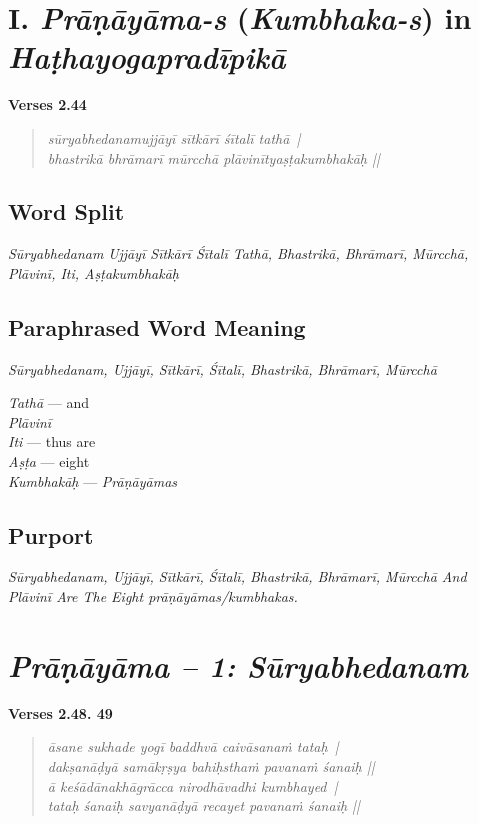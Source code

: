 \section*{I. \textit{Prāṇāyāma-s} (\textit{Kumbhaka-s}) in \textit{Haṭhayogapradīpikā}}

\noindent 
\textbf{Verses 2.44}

\begin{verse}
\textit{sūryabhedanamujjāyī sītkārī śītalī tathā |\\
bhastrikā bhrāmarī mūrcchā plāvinītyaṣṭakumbhakāḥ ||}
\end{verse}

\subsection*{Word Split}

\textit{Sūryabhedanam Ujjāyī Sītkārī Śītalī Tathā, Bhastrikā, Bhrāmarī, Mūrcchā, Plāvinī, Iti, Aṣṭakumbhakāḥ}

\subsection*{Paraphrased Word Meaning}

\textit{Sūryabhedanam, Ujjāyī, Sītkārī, Śītalī, Bhastrikā, Bhrāmarī, Mūrcchā}

\begin{multicols}{2}
\textit{Tathā} --- and \\
\textit{Plāvinī}  \\
\textit{Iti}  --- thus are \\
\textit{Aṣṭa} --- eight \\
\textit{Kumbhakāḥ} --- \textit{Prāṇāyāmas} 
\end{multicols}

\subsection*{Purport}

\textit{Sūryabhedanam, Ujjāyī, Sītkārī, Śītalī, Bhastrikā, Bhrāmarī, Mūrcchā And Plāvinī Are The Eight prāṇāyāmas/kumbhakas.}


\section*{\textit{Prāṇāyāma -- 1: Sūryabhedanam}}

\noindent \textbf{Verses 2.48. 49}

\begin{verse}
\textit{āsane sukhade yogī baddhvā caivāsanaṁ tataḥ |\\
dakṣanāḍyā samākṛṣya bahiḥsthaṁ pavanaṁ śanaiḥ ||\\
ā keśādānakhāgrācca nirodhāvadhi kumbhayed |\\
tataḥ śanaiḥ savyanāḍyā recayet pavanaṁ śanaiḥ ||}
\end{verse}

